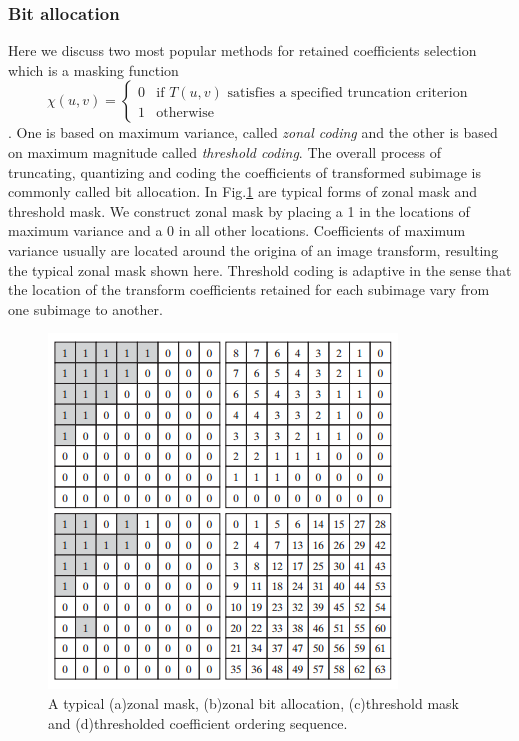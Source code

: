 \subsubsection{Bit allocation}
Here we discuss two most popular methods for retained coefficients selection which is a masking function 
\begin{equation}\chi(u,v)= \left\{ \begin{array}{rcl}
0 & \text{if $T(u,v)$ satisfies a specified truncation criterion}\\
1 & \text{otherwise}
\end{array} \right. \end{equation}. One is based on maximum variance, called \emph{zonal coding} and the other is based on maximum magnitude called \emph{threshold coding}. The overall process of truncating, quantizing and coding the coefficients of transformed subimage is commonly called bit allocation. In Fig.\ref{fig:bitalloc} are typical forms of zonal mask and threshold mask. We construct zonal mask by placing a 1 in the locations of maximum variance and a 0 in all other locations. Coefficients of maximum variance usually are located around the origina of an image transform, resulting the typical zonal mask shown here. Threshold coding is adaptive in the sense that the location of the transform coefficients retained for each subimage vary from one subimage to another.\\
\begin{figure}[h!]
	\centering	
	\includegraphics[width=0.7\linewidth]{myfigure/p7/bit_allocation.png}
	\caption{A typical (a)zonal mask, (b)zonal bit allocation, (c)threshold mask and (d)thresholded coefficient ordering sequence.}
	\label{fig:bitalloc}
\end{figure}

